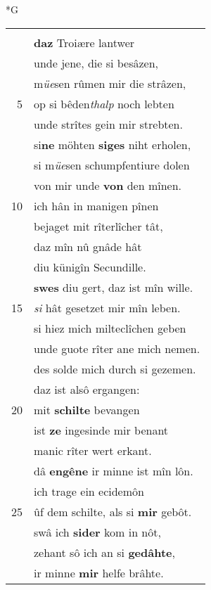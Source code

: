 \documentclass[8pt,a4paper,notitlepage]{article}
\begin{document}
\begin{table}[ht]
\begin{minipage}[t]{0.5\linewidth}
\small
\begin{center}*G
\end{center}
\begin{tabular}{rl}
 & \textit{\begin{large}I\end{large}}ch vüere sô kreftigez her,\\ 
 & \textbf{daz} Troiære lantwer\\ 
 & unde jene, die si besâzen,\\ 
 & m\textit{üe}sen rûmen mir die strâzen,\\ 
5 & op si bêden\textit{thalp} noch lebten\\ 
 & unde strîtes gein mir strebten.\\ 
 & si\textbf{ne} möhten \textbf{siges} niht erholen,\\ 
 & si m\textit{üe}sen schumpfentiure dolen\\ 
 & von mir unde \textbf{von} den mînen.\\ 
10 & ich hân in manigen pînen\\ 
 & bejaget mit rîterlîcher tât,\\ 
 & daz mîn nû gnâde hât\\ 
 & diu künigîn Secundille.\\ 
 & \textbf{swes} diu gert, daz ist mîn wille.\\ 
15 & \textit{si} hât gesetzet mir mîn leben.\\ 
 & si hiez mich milteclîchen geben\\ 
 & unde guote rîter ane mich nemen.\\ 
 & des solde mich durch si gezemen.\\ 
 & daz ist alsô ergangen:\\ 
20 & mit \textbf{schilte} bevangen\\ 
 & ist \textbf{ze} ingesinde mir benant\\ 
 & manic rîter wert erkant.\\ 
 & dâ \textbf{engêne} ir minne ist mîn lôn.\\ 
 & ich trage ein ecidemôn\\ 
25 & ûf dem schilte, als si \textbf{mir} gebôt.\\ 
 & swâ ich \textbf{sider} kom in nôt,\\ 
 & zehant sô ich an si \textbf{gedâhte},\\ 
 & ir minne \textbf{mir} helfe brâhte.\\ 

\end{tabular}
\end{minipage}
\end{table}
\end{document}
